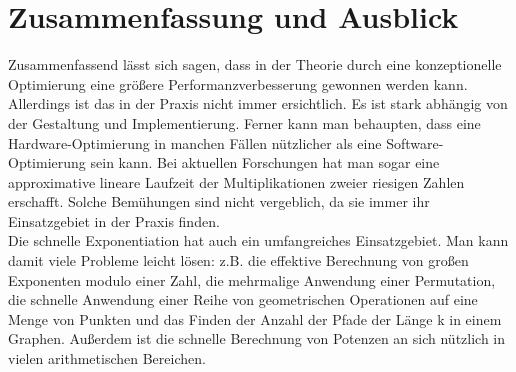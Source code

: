 \documentclass[course=erap]{aspdoc}
\begin{document}
\section{Zusammenfassung und Ausblick}
Zusammenfassend lässt sich sagen, dass in der Theorie durch eine konzeptionelle Optimierung eine größere Performanzverbesserung gewonnen werden kann. Allerdings ist das in der Praxis nicht immer ersichtlich. Es ist stark abhängig von der Gestaltung und Implementierung. Ferner kann man behaupten, dass eine Hardware-Optimierung in manchen Fällen nützlicher als eine Software-Optimierung sein kann. Bei aktuellen Forschungen hat man sogar eine approximative lineare Laufzeit der Multiplikationen zweier riesigen Zahlen erschafft. Solche Bemühungen sind nicht vergeblich, da sie immer ihr Einsatzgebiet in der Praxis finden.
\\Die schnelle Exponentiation hat auch ein umfangreiches Einsatzgebiet. Man kann damit viele Probleme leicht lösen: z.B. die effektive Berechnung von großen Exponenten modulo einer Zahl, die mehrmalige Anwendung einer Permutation, die schnelle Anwendung einer Reihe von geometrischen Operationen auf eine Menge von Punkten und das Finden der Anzahl der Pfade der Länge k in einem Graphen\cite{binaryExponentiation}. Außerdem ist die schnelle Berechnung von Potenzen an sich nützlich in vielen arithmetischen Bereichen.

\newpage

{}
\end{document}
